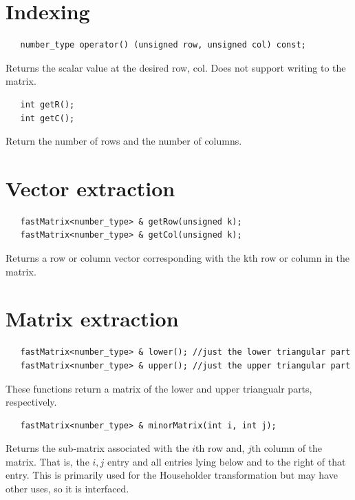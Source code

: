 \documentclass[10pt,fullpage]{article}
\begin{document}
\section{Indexing}

\begin{verbatim}
   number_type operator() (unsigned row, unsigned col) const;
\end{verbatim}

Returns the scalar value at the desired row, col. Does not support
writing to the matrix.

\begin{verbatim}
   int getR();
   int getC();
\end{verbatim}

Return the number of rows and the number of columns.

\section{Vector extraction}

\begin{verbatim}
   fastMatrix<number_type> & getRow(unsigned k);
   fastMatrix<number_type> & getCol(unsigned k);
\end{verbatim}

Returns a row or column vector corresponding with the kth row or
column in the matrix.

\section{Matrix extraction}

\begin{verbatim}
   fastMatrix<number_type> & lower(); //just the lower triangular part
   fastMatrix<number_type> & upper(); //just the upper triangular part
\end{verbatim}

These functions return a matrix of the lower and upper triangualr
parts, respectively.

\begin{verbatim}
   fastMatrix<number_type> & minorMatrix(int i, int j);
\end{verbatim}

Returns the sub-matrix associated with the $i$th row and, $j$th
column of the matrix. That is, the $i,j$ entry and all entries lying
below and to the right of that entry. This is primarily used for the
Householder transformation but may have other uses, so it is
interfaced.
\end{document}
